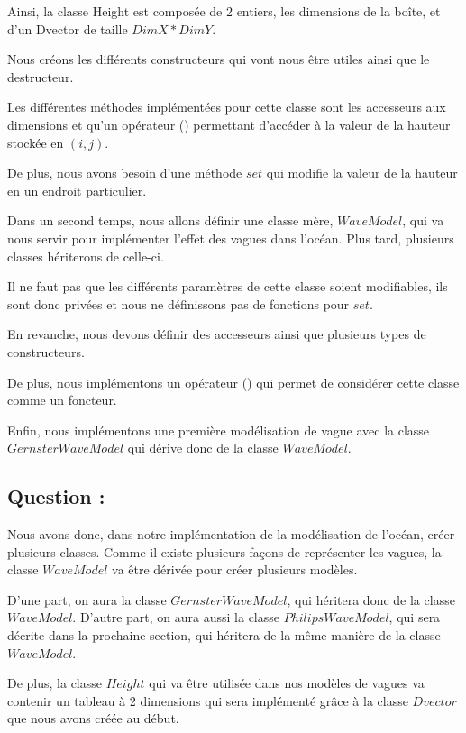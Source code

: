 \documentclass{article}
\begin{document}
Ainsi, la classe Height est composée de 2 entiers, les dimensions de la boîte, et d'un Dvector de taille $DimX * DimY$.

Nous créons les différents constructeurs qui vont nous être utiles ainsi que le destructeur.

Les différentes méthodes implémentées pour cette classe sont les accesseurs aux dimensions et qu'un opérateur () permettant d'accéder à la valeur de la hauteur stockée en $(i,j)$.

De plus, nous avons besoin d'une méthode $set$ qui modifie la valeur de la hauteur en un endroit particulier.

Dans un second temps,  nous allons définir une classe mère, $WaveModel$, qui va nous servir pour implémenter l'effet des vagues dans l'océan. Plus tard, plusieurs classes hériterons de celle-ci.

Il ne faut pas que les différents paramètres de cette classe soient modifiables, ils sont donc privées et nous ne définissons pas de fonctions pour $set$.

En revanche, nous devons définir des accesseurs ainsi que plusieurs types de constructeurs.

De plus, nous implémentons un opérateur () qui permet de considérer cette classe comme un foncteur.

Enfin, nous implémentons une première modélisation de vague avec la classe $GernsterWaveModel$ qui dérive donc de la classe $WaveModel$.

\vspace{0.5cm}

\subsection{Question :}

Nous avons donc, dans notre implémentation de la modélisation de l'océan, créer plusieurs classes. Comme il existe plusieurs façons de représenter les vagues, la classe $WaveModel$ va être dérivée pour créer plusieurs modèles.

D'une part, on aura la classe $GernsterWaveModel$, qui héritera donc de la classe $WaveModel$. D'autre part, on aura aussi la classe $PhilipsWaveModel$, qui sera décrite dans la prochaine section, qui héritera de la même manière de la classe $WaveModel$.

De plus, la classe $Height$ qui va être utilisée dans nos modèles de vagues va contenir un tableau à 2 dimensions qui sera implémenté grâce à la classe $Dvector$ que nous avons créée au début.
\end{document}

